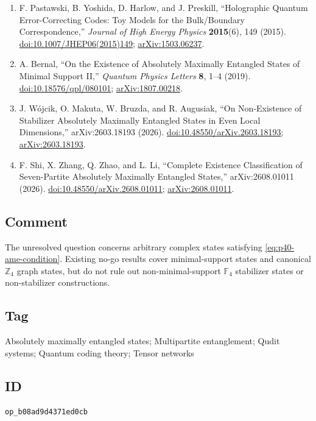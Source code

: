\begin{enumerate}[label={},leftmargin=4.8em,labelsep=0.5em]
  \footnotesize
  \item[\textup{[PYHP15]}]\label{ref:p40-pastawski}
  F. Pastawski, B. Yoshida, D. Harlow, and J. Preskill,
  ``Holographic Quantum Error-Correcting Codes: Toy Models for the
  Bulk/Boundary Correspondence,'' \emph{Journal of High Energy Physics}
  \textbf{2015}(6), 149 (2015).
  \href{https://doi.org/10.1007/JHEP06(2015)149}%
       {doi:10.1007/JHEP06(2015)149};
  \href{https://arxiv.org/abs/1503.06237}{arXiv:1503.06237}.

  \item[\textup{[Ber19]}]\label{ref:p40-bernal}
  A. Bernal,
  ``On the Existence of Absolutely Maximally Entangled States of Minimal
  Support II,'' \emph{Quantum Physics Letters} \textbf{8}, 1--4 (2019).
  \href{https://doi.org/10.18576/qpl/080101}{doi:10.18576/qpl/080101};
  \href{https://arxiv.org/abs/1807.00218}{arXiv:1807.00218}.

  \item[\textup{[WMB+26]}]\label{ref:p40-wojcik}
  J. W\'ojcik, O. Makuta, W. Bruzda, and R. Augusiak,
  ``On Non-Existence of Stabilizer Absolutely Maximally Entangled States in
  Even Local Dimensions,'' arXiv:2603.18193 (2026).
  \href{https://doi.org/10.48550/arXiv.2603.18193}%
       {doi:10.48550/arXiv.2603.18193};
  \href{https://arxiv.org/abs/2603.18193}{arXiv:2603.18193}.

  \item[\textup{[SZZL26]}]\label{ref:p40-shi}
  F. Shi, X. Zhang, Q. Zhao, and L. Li,
  ``Complete Existence Classification of Seven-Partite Absolutely Maximally
  Entangled States,'' arXiv:2608.01011 (2026).
  \href{https://doi.org/10.48550/arXiv.2608.01011}%
       {doi:10.48550/arXiv.2608.01011};
  \href{https://arxiv.org/abs/2608.01011}{arXiv:2608.01011}.
\end{enumerate}

\subsection*{Comment}

The unresolved question concerns arbitrary complex states satisfying
\eqref{eq:p40-ame-condition}.  Existing no-go results cover minimal-support
states and canonical $\mathbb{Z}_{4}$ graph states, but do not rule out
non-minimal-support $\mathbb{F}_{4}$ stabilizer states or non-stabilizer
constructions.

\subsection*{Tag}

Absolutely maximally entangled states; Multipartite entanglement; Qudit systems;
Quantum coding theory; Tensor networks

\subsection*{ID}

\texttt{op\_b08ad9d4371ed0cb}
